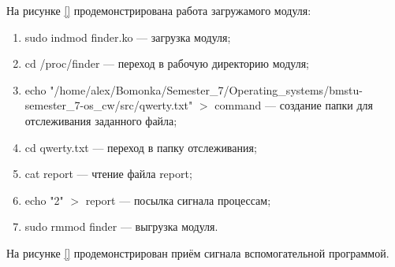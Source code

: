 На рисунке \ref{} продемонстрирована работа загружамого модуля:
\begin{enumerate}[label=\arabic*.]
	\item sudo indmod finder.ko --- загрузка модуля;
	\item cd /proc/finder --- переход в рабочую директорию модуля;
	\item echo "/home/alex/Bomonka/Semester\_7/Operating\_systems/bmstu-semester\_7-os\_cw/src/qwerty.txt" $>$ command --- создание папки для отслеживания заданного файла;
	\item cd qwerty.txt --- переход в папку отслеживания;
	\item cat report --- чтение файла report;
	\item echo "2" $>$ report --- посылка сигнала процессам;
	\item sudo rmmod finder --- выгрузка модуля.
\end{enumerate}

На рисунке \ref{} продемонстрирован приём сигнала вспомогательной программой.